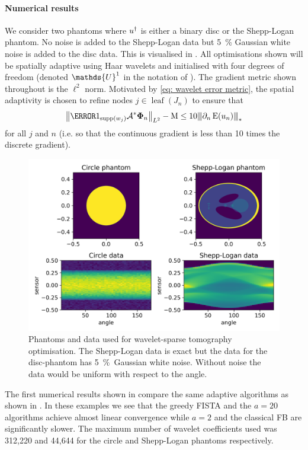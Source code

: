\documentclass[10pt,a4paper,onecolumn]{article}
\numberwithin{equation}{section}
\let\F\mathds\let\C\mathcal\newcommand{\R}{\F{R}}\newcommand{\A}{\C{A}}
\newcommand{\Norm}[1]{{\left\vert\kern-0.25ex\left\vert\kern-0.25ex\left\vert #1 \right\vert\kern-0.25ex\right\vert\kern-0.25ex\right\vert}}
\newcommand{\norm}[1]{{\left\lVert #1 \right\rVert}}
\newcommand{\op}[1]{\operatorname{#1}}\newcommand{\overtext}[2]{\stackrel{\text{#1}}{#2}}
\renewcommand{\vec}{\mathbf}
\newcommand*{\Func}[1]{%
	\IfEqCase{#1}{%
		{0}{\op{E}}%
		{1}{\op{F}}%
		{2}{\op{G}}%
		{3}{\op{H}}%
	}[\op{F}#1]%
}
\newcommand*{\varf}[1]{%
	\IfEqCase{#1}{%
		{0}{u}%
		{1}{v}%
		{2}{w}%
	}[u#1]%
}
\newcommand*{\spcf}[1]{%
	\IfEqCase{#1}{%
		{0}{\F{U}}%
		{1}{\F{V}}%
		{2}{\F{W}}%
	}[\F{U}#1]%
}
\newcommand*{\vard}[1]{%
	\IfEqCase{#1}{%
		{0}{\varphi}%
		{1}{\psi}%
	}[\varphi #1]%
}
\newcommand*{\data}[1]{%
	\IfEqCase{#1}{%
		{0}{\eta}%
		{1}{\nu}%
	}[g]%
}
\newcommand*{\vvard}[1]{\vec{\vard{#1}}}\newcommand*{\vdata}[1]{\vec{\data{#1}}}
\begin{document}
\paragraph{Numerical results}
We consider two phantoms where $\varf0^\dagger$ is either a binary disc or the Shepp-Logan phantom. No noise is added to the Shepp-Logan data but \SI{5}{\percent} Gaussian white noise is added to the disc data. This is visualised in . All optimisations shown will be spatially adaptive using Haar wavelets and initialised with four degrees of freedom (denoted $\spcf0^1$ in the notation of ). The gradient metric shown throughout is the $\ell^2$ norm. Motivated by \eqref{eq: wavelet error metric}, the spatial adaptivity is chosen to refine nodes $j\in\op{leaf}(J_n)$ to ensure that 
$$ \norm{\1_{\supp(w_j)}\A^*\vvard0_n}_{L^2} -\mu  \leq 10\Norm{\partial_n\Func0(\varf0_n)}_*$$
for all $j$ and $n$ (i.e. so that the continuous gradient is less than 10 times the discrete gradient).

\begin{figure}\centering
	\includegraphics[width=.84\textwidth]{haar_data}
	\caption{Phantoms and data used for wavelet-sparse tomography optimisation. The Shepp-Logan data is exact but the data for the disc-phantom has \SI{5}{\percent}\ Gaussian white noise. Without noise the data would be uniform with respect to the angle.}\label{fig: haar data}
\end{figure}

The first numerical results shown in  compare the same adaptive algorithms as shown in . In these examples we see that the greedy FISTA and the $a=20$ algorithms achieve almost linear convergence while $a=2$ and the classical FB are significantly slower. The maximum number of wavelet coefficients used was 312,220 and 44,644 for the circle and Shepp-Logan phantoms respectively.
\end{document}
